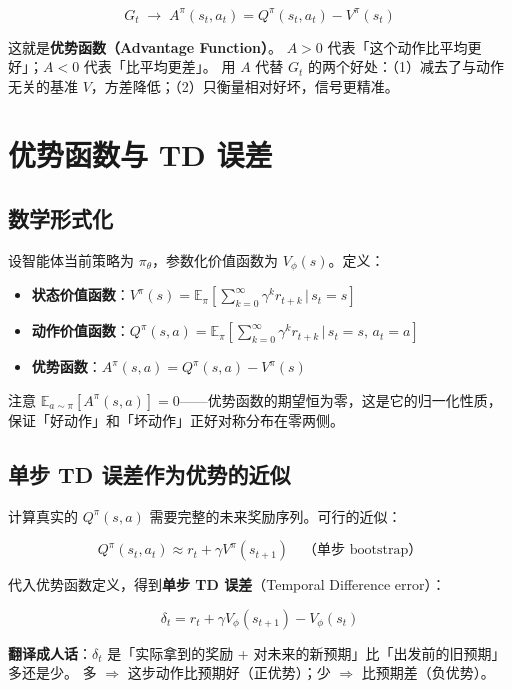 \documentclass{article}
\begin{document}
\[
\boxed{G_t \;\longrightarrow\; A^\pi(s_t, a_t) = Q^\pi(s_t, a_t) - V^\pi(s_t)}
\]

这就是\textbf{优势函数（Advantage Function）}。
$A > 0$ 代表「这个动作比平均更好」；$A < 0$ 代表「比平均更差」。
用 $A$ 代替 $G_t$ 的两个好处：（1）减去了与动作无关的基准 $V$，方差降低；（2）只衡量相对好坏，信号更精准。

\section*{优势函数与 TD 误差}

\subsection*{数学形式化}

设智能体当前策略为 $\pi_\theta$，参数化价值函数为 $V_\phi(s)$。定义：

\begin{itemize}
  \item \textbf{状态价值函数}：$V^\pi(s) = \mathbb{E}_\pi\!\left[\sum_{k=0}^{\infty} \gamma^k r_{t+k} \,\Big|\, s_t=s\right]$
  \item \textbf{动作价值函数}：$Q^\pi(s,a) = \mathbb{E}_\pi\!\left[\sum_{k=0}^{\infty} \gamma^k r_{t+k} \,\Big|\, s_t=s,\,a_t=a\right]$
  \item \textbf{优势函数}：$A^\pi(s,a) = Q^\pi(s,a) - V^\pi(s)$
\end{itemize}

注意 $\mathbb{E}_{a \sim \pi}\!\left[A^\pi(s,a)\right] = 0$——优势函数的期望恒为零，这是它的归一化性质，
保证「好动作」和「坏动作」正好对称分布在零两侧。

\subsection*{单步 TD 误差作为优势的近似}

计算真实的 $Q^\pi(s,a)$ 需要完整的未来奖励序列。可行的近似：

\[
Q^\pi(s_t, a_t) \approx r_t + \gamma V^\pi(s_{t+1}) \quad \text{（单步 bootstrap）}
\]

代入优势函数定义，得到\textbf{单步 TD 误差}（Temporal Difference error）：

\[
\boxed{\delta_t = r_t + \gamma V_\phi(s_{t+1}) - V_\phi(s_t)}
\]

\textbf{翻译成人话}：$\delta_t$ 是「实际拿到的奖励 + 对未来的新预期」比「出发前的旧预期」多还是少。
多 $\Rightarrow$ 这步动作比预期好（正优势）；少 $\Rightarrow$ 比预期差（负优势）。
\end{document}
